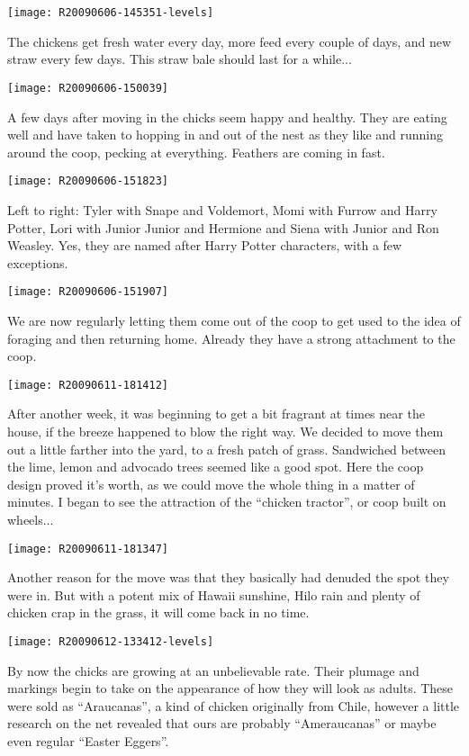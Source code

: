 \texttt{[image: R20090606-145351-levels]}

The chickens get fresh water every day, more feed every couple of days,
and new straw every few days.  This straw bale should last for a
while... 
\newpage

\texttt{[image: R20090606-150039]}

A few days after moving in the chicks seem happy and healthy.  They are
eating well and have taken to hopping in and out of the nest as they
like and running around the coop, pecking at everything.  Feathers are
coming in fast. 
\newpage

\texttt{[image: R20090606-151823]}

Left to right: Tyler with Snape and Voldemort, Momi with Furrow and
Harry Potter, Lori with Junior Junior and Hermione and Siena with Junior
and Ron Weasley.  Yes, they are named after Harry Potter characters,
with a few exceptions. 
\newpage

\texttt{[image: R20090606-151907]}

We are now regularly letting them come out of the coop to get used to
the idea of foraging and then returning home.  Already they have a
strong attachment to the coop. 
\newpage

\texttt{[image: R20090611-181412]}

After another week, it was beginning to get a bit fragrant at times near
the house, if the breeze happened to blow the right way.  We decided to
move them out a little farther into the yard, to a fresh patch of grass.
Sandwiched between the lime, lemon and advocado trees seemed like a good
spot.  Here the coop design proved it's worth, as we could move the
whole thing in a matter of minutes.  I began to see the attraction of
the ``chicken tractor'', or coop built on wheels... 
\newpage

\texttt{[image: R20090611-181347]}

Another reason for the move was that they basically had denuded the spot
they were in.  But with a potent mix of Hawaii sunshine, Hilo rain and
plenty of chicken crap in the grass, it will come back in no time. 
\newpage

\texttt{[image: R20090612-133412-levels]}

By now the chicks are growing at an unbelievable rate.  Their plumage
and markings begin to take on the appearance of how they will look as
adults.  These were sold as ``Araucanas'', a kind of chicken originally
from Chile, however a little research on the net revealed that ours are
probably ``Ameraucanas'' or maybe even regular ``Easter Eggers''.  
\newpage

